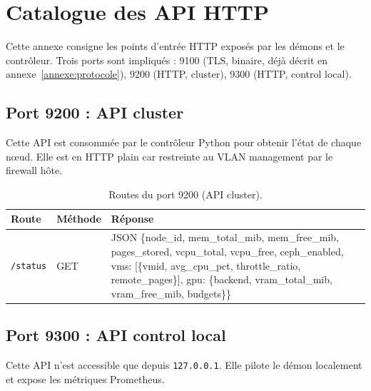 \chapter{Catalogue des API HTTP}
\label{annexe:api}

Cette annexe consigne les points d'entrée HTTP exposés par les démons et le contrôleur. Trois ports sont impliqués : 9100 (TLS, binaire, déjà décrit en annexe~\ref{annexe:protocole}), 9200 (HTTP, cluster), 9300 (HTTP, control local).

\section{Port 9200 : API cluster}

Cette API est consommée par le contrôleur Python pour obtenir l'état de chaque nœud. Elle est en HTTP plain car restreinte au VLAN management par le firewall hôte.

\begin{table}[H]
\centering
\small
\begin{tabular}{lp{2.5cm}p{8cm}}
\toprule
\textbf{Route} & \textbf{Méthode} & \textbf{Réponse} \\
\midrule
\texttt{/status}      & GET & JSON \{node\_id, mem\_total\_mib, mem\_free\_mib, pages\_stored, vcpu\_total, vcpu\_free, ceph\_enabled, vms: [\{vmid, avg\_cpu\_pct, throttle\_ratio, remote\_pages\}], gpu: \{backend, vram\_total\_mib, vram\_free\_mib, budgets\}\} \\
\bottomrule
\end{tabular}
\caption{Routes du port 9200 (API cluster).}
\end{table}

\section{Port 9300 : API control local}

Cette API n'est accessible que depuis \texttt{127.0.0.1}. Elle pilote le démon localement et expose les métriques Prometheus.

